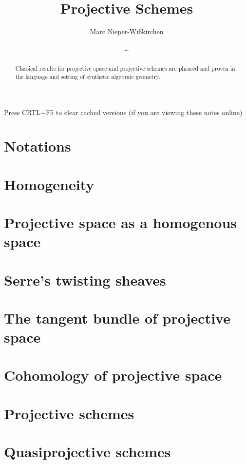 \documentclass{../util/zariski}
\title{Projective Schemes}
\author{Marc Nieper-Wi\ss{}kirchen \and \dots}
\begin{document}
\maketitle

\begin{center}
  \color{purple}
  \large{Press CRTL+F5 to clear cached versions}
  \large{(if you are viewing these notes online)}
\end{center}

\begin{abstract}
  Classical results for projective space and projective schemes are
  phrased and proven in the language and setting of synthetic
  algebraic geometry.
\end{abstract}

\tableofcontents

\section{Notations}


\section{Homogeneity}


\section{Projective space as a homogenous space}

\section{Serre's twisting sheaves}

\section{The tangent bundle of projective space}

\section{Cohomology of projective space}

\section{Projective schemes}

\section{Quasiprojective schemes}

\printindex

\printbibliography
\end{document}
